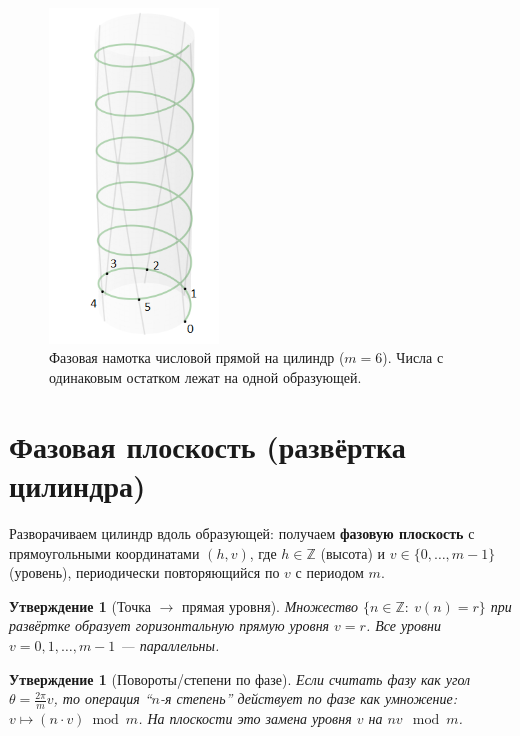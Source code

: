 \documentclass[11pt,a4paper]{article}
\newtheorem{proposition}[definition]{Утверждение}
\newcommand{\Z}{\mathbb{Z}}
\begin{document}
\begin{figure}[H]
\centering
\includegraphics[width=0.4\textwidth]{phase_cylinder.png} %
\caption{Фазовая намотка числовой прямой на цилиндр ($m=6$). Числа с одинаковым остатком лежат на одной образующей.}
\label{fig:cylinder}
\end{figure}

\section{Фазовая плоскость (развёртка цилиндра)}
Разворачиваем цилиндр вдоль образующей: получаем \textbf{фазовую плоскость} с прямоугольными координатами $(h,v)$, где $h\in\Z$ (высота) и $v\in\{0,\dots,m-1\}$ (уровень), периодически повторяющийся по $v$ с периодом $m$.

\begin{proposition}[Точка $\to$ прямая уровня]\label{prop:level-lines}
Множество $\{n\in\Z:\ v(n)=r\}$ при развёртке образует горизонтальную прямую уровня $v=r$. Все уровни $v=0,1,\dots,m-1$ --- параллельны.
\end{proposition}

\begin{proposition}[Повороты/степени по фазе]\label{prop:powers}
Если считать фазу как угол $\theta=\frac{2\pi}{m}v$, то операция ``$n$-я степень'' действует по фазе как умножение: $v\mapsto (n\cdot v)\bmod m$. На плоскости это замена уровня $v$ на $n v\mod m$.
\end{proposition}
\end{document}
